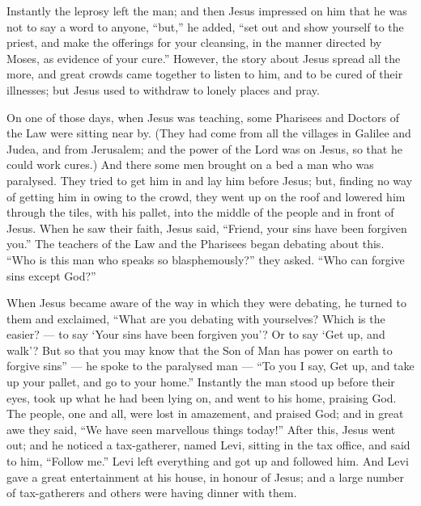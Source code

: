 Instantly the leprosy left the man;  and then Jesus
impressed on him that he was not to say a word to anyone, ``but,'' he
added, ``set out and show yourself to the priest, and make the offerings
for your cleansing, in the manner directed by Moses, as evidence of your
cure.''  However, the story about Jesus spread all the
more, and great crowds came together to listen to him, and to be cured
of their illnesses;  but Jesus used to withdraw to lonely
places and pray.

 On one of those days, when Jesus was teaching, some
Pharisees and Doctors of the Law were sitting near by. (They had come
from all the villages in Galilee and Judea, and from Jerusalem; and the
power of the Lord was on Jesus, so that he could work cures.)
 And there some men brought on a bed a man who was
paralysed. They tried to get him in and lay him before Jesus;
 but, finding no way of getting him in owing to the crowd,
they went up on the roof and lowered him through the tiles, with his
pallet, into the middle of the people and in front of Jesus.
 When he saw their faith, Jesus said, ``Friend, your sins
have been forgiven you.''  The teachers of the Law and the
Pharisees began debating about this. ``Who is this man who speaks so
blasphemously?'' they asked. ``Who can forgive sins except God?''

 When Jesus became aware of the way in which they were
debating, he turned to them and exclaimed, ``What are you debating with
yourselves?  Which is the easier? --- to say `Your sins
have been forgiven you'? Or to say `Get up, and walk'?  But
so that you may know that the Son of Man has power on earth to forgive
sins'' --- he spoke to the paralysed man --- ``To you I say, Get up, and
take up your pallet, and go to your home.''  Instantly the
man stood up before their eyes, took up what he had been lying on, and
went to his home, praising God.  The people, one and all,
were lost in amazement, and praised God; and in great awe they said,
``We have seen marvellous things today!''  After this,
Jesus went out; and he noticed a tax-gatherer, named Levi, sitting in
the tax office, and said to him, ``Follow me.''  Levi left
everything and got up and followed him.  And Levi gave a
great entertainment at his house, in honour of Jesus; and a large number
of tax-gatherers and others were having dinner with them.

